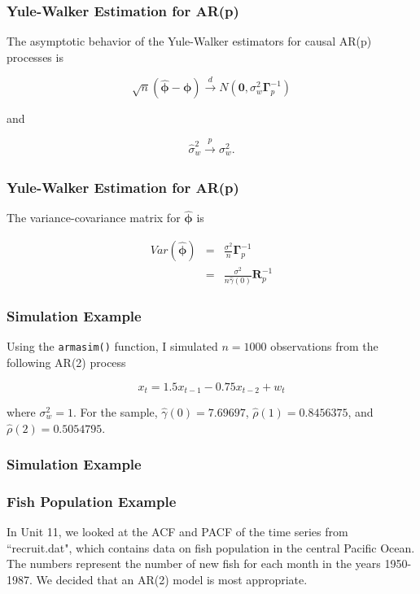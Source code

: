 \documentclass[%
xcolor=pdftex]{beamer}
\begin{document}
\begin{frame}
\frametitle{Yule-Walker Estimation for AR(p)}

The asymptotic behavior of the Yule-Walker estimators for causal AR(p) processes is

\begin{equation} \label{eq:asymp}
\sqrt{n}\left(\hat{\bm{\phi}} - \bm{\phi}\right) \xrightarrow[]{d} N\left( \bm{0}, \sigma_w^2 \bm{\Gamma}_p^{-1} \right)
\end{equation}

and

\begin{equation*}
\hat{\sigma}_w^2 \xrightarrow[]{p} \sigma_w^2.
\end{equation*}

\end{frame}

\begin{frame}
\frametitle{Yule-Walker Estimation for AR(p)}

The variance-covariance matrix for $\hat{\bm{\phi}}$ is

\begin{eqnarray} \label{eq:varmatrix}
Var(\hat{\bm{\phi}}) &=& \frac{\sigma^2}{n} \bm{\Gamma}_p^{-1} \nonumber \\
                     &=& \frac{\sigma^2}{n\hat{\gamma}(0)}  \bm{R}_p^{-1}
\end{eqnarray}

\end{frame}


\begin{frame}[fragile]
\frametitle{Simulation Example}

Using the \verb=armasim()= function, I simulated $n=1000$ observations from the following AR(2) process

$$
x_t = 1.5 x_{t-1} - 0.75 x_{t-2} + w_t
$$

where $\sigma_w^2 = 1$. For the sample, $\hat{\gamma}(0) = 7.69697$, $\hat{\rho}(1)=0.8456375$, and $\hat{\rho}(2) = 0.5054795$.

\end{frame}

\begin{frame}
\frametitle{Simulation Example}



\end{frame}

\begin{frame}
\frametitle{Fish Population Example}

In Unit 11, we looked at the ACF and PACF of the time series from ``recruit.dat", which contains data on fish population in the central Pacific Ocean. The numbers represent the number of new fish for each month in the years 1950-1987. We decided that an AR(2) model is most appropriate.
\end{frame}
\end{document}
